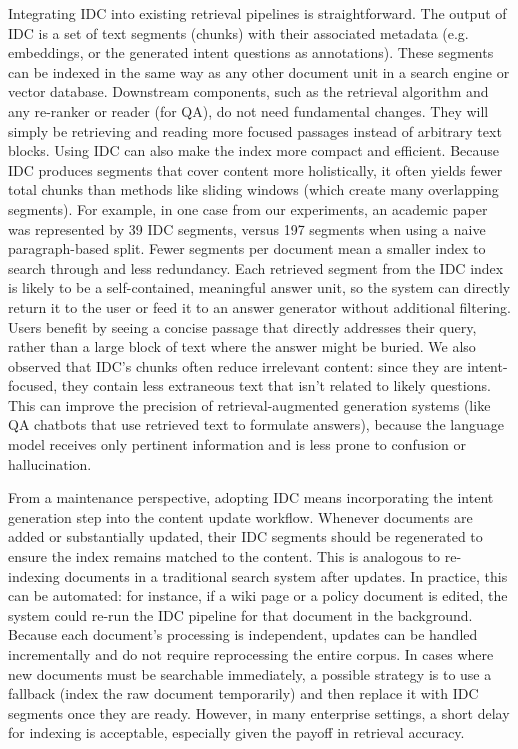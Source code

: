 \documentclass[12pt,a4paper]{report}
\begin{document}
Integrating IDC into existing retrieval pipelines is straightforward. The output of IDC is a set of text segments (chunks) with their associated metadata (e.g. embeddings, or the generated intent questions as annotations). These segments can be indexed in the same way as any other document unit in a search engine or vector database. Downstream components, such as the retrieval algorithm and any re-ranker or reader (for QA), do not need fundamental changes. They will simply be retrieving and reading more focused passages instead of arbitrary text blocks. Using IDC can also make the index more compact and efficient. Because IDC produces segments that cover content more holistically, it often yields fewer total chunks than methods like sliding windows (which create many overlapping segments). For example, in one case from our experiments, an academic paper was represented by 39 IDC segments, versus 197 segments when using a naive paragraph-based split. Fewer segments per document mean a smaller index to search through and less redundancy. Each retrieved segment from the IDC index is likely to be a self-contained, meaningful answer unit, so the system can directly return it to the user or feed it to an answer generator without additional filtering. Users benefit by seeing a concise passage that directly addresses their query, rather than a large block of text where the answer might be buried. We also observed that IDC's chunks often reduce irrelevant content: since they are intent-focused, they contain less extraneous text that isn't related to likely questions. This can improve the precision of retrieval-augmented generation systems (like QA chatbots that use retrieved text to formulate answers), because the language model receives only pertinent information and is less prone to confusion or hallucination.

From a maintenance perspective, adopting IDC means incorporating the intent generation step into the content update workflow. Whenever documents are added or substantially updated, their IDC segments should be regenerated to ensure the index remains matched to the content. This is analogous to re-indexing documents in a traditional search system after updates. In practice, this can be automated: for instance, if a wiki page or a policy document is edited, the system could re-run the IDC pipeline for that document in the background. Because each document's processing is independent, updates can be handled incrementally and do not require reprocessing the entire corpus. In cases where new documents must be searchable immediately, a possible strategy is to use a fallback (index the raw document temporarily) and then replace it with IDC segments once they are ready. However, in many enterprise settings, a short delay for indexing is acceptable, especially given the payoff in retrieval accuracy.
\end{document}
